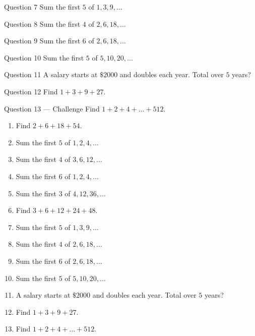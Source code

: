 \documentclass[11pt]{article}
\begin{document}
\begin{qbox}{Question 7}
Sum the first $5$ of $1,3,9,\dots$\workspace{2.4cm}
\end{qbox}

\begin{qbox}{Question 8}
Sum the first $4$ of $2,6,18,\dots$\workspace{2.4cm}
\end{qbox}

\begin{qbox}{Question 9}
Sum the first $6$ of $2,6,18,\dots$\workspace{2.4cm}
\end{qbox}

\begin{qbox}{Question 10}
Sum the first $5$ of $5,10,20,\dots$\workspace{2.4cm}
\end{qbox}

\begin{qbox}{Question 11}
A salary starts at $\$2000$ and doubles each year. Total over $5$ years?\workspace{2.4cm}
\end{qbox}

\begin{qbox}{Question 12}
Find $1+3+9+27$.\workspace{2.4cm}
\end{qbox}

\begin{qbox}{Question 13 --- Challenge}
Find $1+2+4+\dots+512$.\workspace{3cm}
\end{qbox}

\clearpage
{}

\begin{recapbox}
\begin{multicols}{2}
\small
\begin{enumerate}[leftmargin=*,itemsep=3pt]
  \item Find $2+6+18+54$.
  \item Sum the first $5$ of $1,2,4,\dots$
  \item Sum the first $4$ of $3,6,12,\dots$
  \item Sum the first $6$ of $1,2,4,\dots$
  \item Sum the first $3$ of $4,12,36,\dots$
  \item Find $3+6+12+24+48$.
  \item Sum the first $5$ of $1,3,9,\dots$
  \item Sum the first $4$ of $2,6,18,\dots$
  \item Sum the first $6$ of $2,6,18,\dots$
  \item Sum the first $5$ of $5,10,20,\dots$
  \item A salary starts at $\$2000$ and doubles each year. Total over $5$ years?
  \item Find $1+3+9+27$.
  \item Find $1+2+4+\dots+512$.
\end{enumerate}
\end{multicols}
\end{recapbox}
\end{document}
